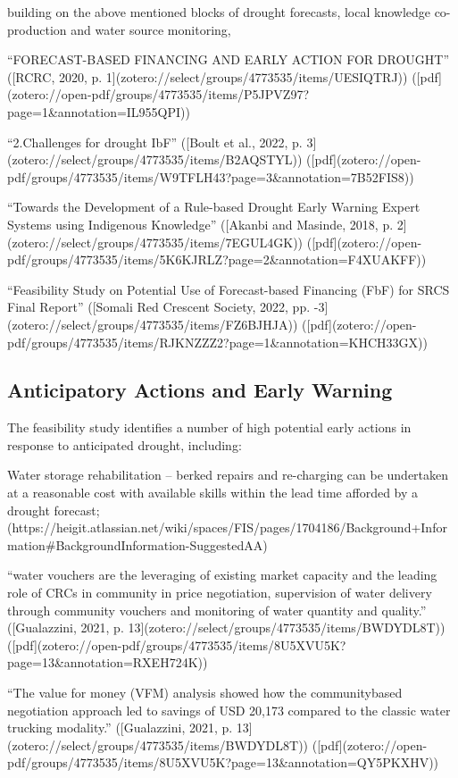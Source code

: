 {building on the above mentioned blocks of drought forecasts, local knowledge co-production and water source monitoring, 

“FORECAST-BASED FINANCING AND EARLY ACTION FOR DROUGHT” ([RCRC, 2020, p. 1](zotero://select/groups/4773535/items/UESIQTRJ)) ([pdf](zotero://open-pdf/groups/4773535/items/P5JPVZ97?page=1&annotation=IL955QPI))

“2.Challenges for drought IbF” ([Boult et al., 2022, p. 3](zotero://select/groups/4773535/items/B2AQSTYL)) ([pdf](zotero://open-pdf/groups/4773535/items/W9TFLH43?page=3&annotation=7B52FIS8))

“Towards the Development of a Rule-based Drought Early Warning Expert Systems using Indigenous Knowledge” ([Akanbi and Masinde, 2018, p. 2](zotero://select/groups/4773535/items/7EGUL4GK)) ([pdf](zotero://open-pdf/groups/4773535/items/5K6KJRLZ?page=2&annotation=F4XUAKFF))

“Feasibility Study on Potential Use of Forecast-based Financing (FbF) for SRCS Final Report” ([Somali Red Crescent Society, 2022, pp. -3](zotero://select/groups/4773535/items/FZ6BJHJA)) ([pdf](zotero://open-pdf/groups/4773535/items/RJKNZZZ2?page=1&annotation=KHCH33GX))

\subsection{Anticipatory Actions and Early Warning}
The feasibility study identifies a number of high potential early actions in response to anticipated drought, including:

Water storage rehabilitation – berked repairs and re-charging can be undertaken at a reasonable cost with available skills within the lead time afforded by a drought forecast; (https://heigit.atlassian.net/wiki/spaces/FIS/pages/1704186/Background+Information#BackgroundInformation-SuggestedAA)

“water vouchers are the leveraging of existing market capacity and the leading role of CRCs in community in price negotiation, supervision of water delivery through community vouchers and monitoring of water quantity and quality.” ([Gualazzini, 2021, p. 13](zotero://select/groups/4773535/items/BWDYDL8T)) ([pdf](zotero://open-pdf/groups/4773535/items/8U5XVU5K?page=13&annotation=RXEH724K))

“The value for money (VFM) analysis showed how the communitybased negotiation approach led to savings of USD 20,173 compared to the classic water trucking modality.” ([Gualazzini, 2021, p. 13](zotero://select/groups/4773535/items/BWDYDL8T)) ([pdf](zotero://open-pdf/groups/4773535/items/8U5XVU5K?page=13&annotation=QY5PKXHV))

}
